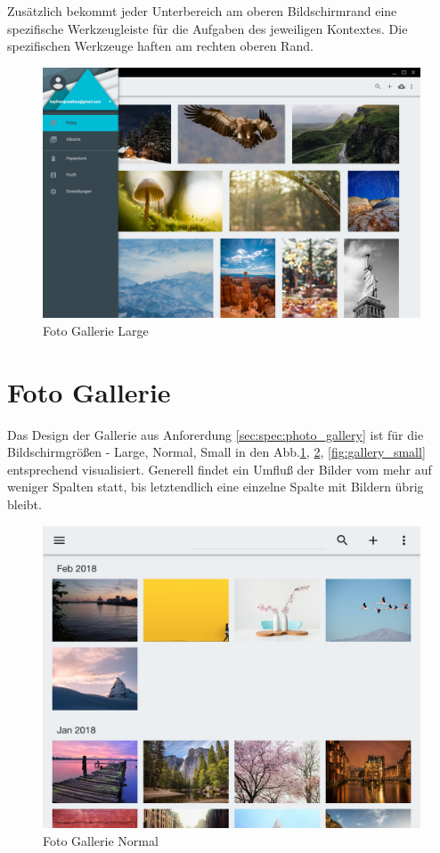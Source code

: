 Zusätzlich bekommt jeder Unterbereich am oberen Bildschirmrand eine spezifische Werkzeugleiste für die Aufgaben des jeweiligen Kontextes. Die spezifischen Werkzeuge haften am rechten oberen Rand.

\begin{figure}[htp]     %
\centering
\includegraphics[width=1.0\textwidth]{images/gallery_large} 
\caption{Foto Gallerie Large}\label{fig:gallery_large}
\end{figure}

\section{Foto Gallerie}

Das Design der Gallerie aus Anforerdung \ref{sec:spec:photo_gallery} ist für die Bildschirmgrößen - Large, Normal, Small in den Abb.\ref{fig:gallery_large}, \ref{fig:gallery_normal}, \ref{fig:gallery_small} entsprechend visualisiert.
Generell findet ein Umfluß der Bilder vom mehr auf weniger Spalten statt, bis letztendlich eine einzelne Spalte mit Bildern übrig bleibt.

\begin{figure}[htp]     %
\centering
\includegraphics[width=1.0\textwidth]{images/gallery_normal} 
\caption{Foto Gallerie Normal}\label{fig:gallery_normal}
\end{figure}

